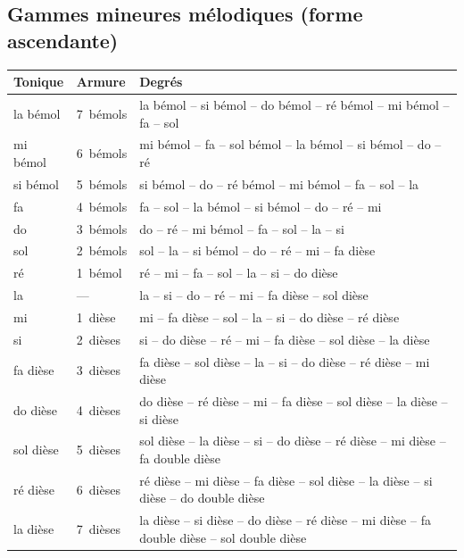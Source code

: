 \subsection{Gammes mineures mélodiques (forme ascendante)}
\begin{longtable}{@{}l l >{\raggedright\arraybackslash}p{12.6cm}@{}}
\toprule
\textbf{Tonique} & \textbf{Armure} & \textbf{Degrés} \\
\midrule
\endhead
la bémol & 7~bémols & la bémol -- si bémol -- do bémol -- ré bémol -- mi bémol -- fa -- sol \\
mi bémol & 6~bémols & mi bémol -- fa -- sol bémol -- la bémol -- si bémol -- do -- ré \\
si bémol & 5~bémols & si bémol -- do -- ré bémol -- mi bémol -- fa -- sol -- la \\
fa & 4~bémols & fa -- sol -- la bémol -- si bémol -- do -- ré -- mi \\
do & 3~bémols & do -- ré -- mi bémol -- fa -- sol -- la -- si \\
sol & 2~bémols & sol -- la -- si bémol -- do -- ré -- mi -- fa dièse \\
ré & 1~bémol & ré -- mi -- fa -- sol -- la -- si -- do dièse \\
la & --- & la -- si -- do -- ré -- mi -- fa dièse -- sol dièse \\
mi & 1~dièse & mi -- fa dièse -- sol -- la -- si -- do dièse -- ré dièse \\
si & 2~dièses & si -- do dièse -- ré -- mi -- fa dièse -- sol dièse -- la dièse \\
fa dièse & 3~dièses & fa dièse -- sol dièse -- la -- si -- do dièse -- ré dièse -- mi dièse \\
do dièse & 4~dièses & do dièse -- ré dièse -- mi -- fa dièse -- sol dièse -- la dièse -- si dièse \\
sol dièse & 5~dièses & sol dièse -- la dièse -- si -- do dièse -- ré dièse -- mi dièse -- fa double dièse \\
ré dièse & 6~dièses & ré dièse -- mi dièse -- fa dièse -- sol dièse -- la dièse -- si dièse -- do double dièse \\
la dièse & 7~dièses & la dièse -- si dièse -- do dièse -- ré dièse -- mi dièse -- fa double dièse -- sol double dièse \\
\bottomrule
\end{longtable}

